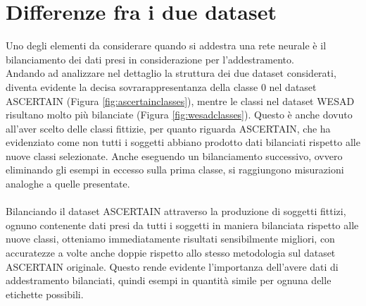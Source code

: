 \section{Differenze fra i due dataset}
Uno degli elementi da considerare quando si addestra una rete neurale è il bilanciamento dei dati presi in considerazione per l'addestramento.\\
Andando ad analizzare nel dettaglio la struttura dei due dataset considerati, diventa evidente la decisa sovrarappresentanza della classe 0 nel dataset ASCERTAIN (Figura \ref{fig:ascertainclasses}), mentre le classi nel dataset WESAD risultano molto più bilanciate (Figura \ref{fig:wesadclasses}). Questo è anche dovuto all'aver scelto delle classi fittizie, per quanto riguarda ASCERTAIN, che ha evidenziato come non tutti i soggetti abbiano prodotto dati bilanciati rispetto alle nuove classi selezionate. Anche eseguendo un bilanciamento successivo, ovvero eliminando gli esempi in eccesso sulla prima classe, si raggiungono misurazioni analoghe a quelle presentate.\\\\
Bilanciando il dataset ASCERTAIN attraverso la produzione di soggetti fittizi, ognuno contenente dati presi da tutti i soggetti in maniera bilanciata rispetto alle nuove classi, otteniamo immediatamente risultati sensibilmente migliori, con accuratezze a volte anche doppie rispetto allo stesso metodologia sul dataset ASCERTAIN originale. Questo rende evidente l'importanza dell'avere dati di addestramento bilanciati, quindi esempi in quantità simile per ognuna delle etichette possibili.
